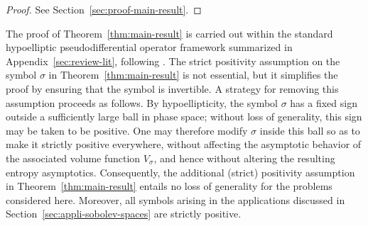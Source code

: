 \documentclass[a4paper,12pt]{article}
\newtheorem{theorem}{Theorem}%
\newcommand{\R}{\mathbb{R}}
\newcommand{\diff}{\mathop{}\!d}
\newcommand{\hyposymbclassinv}{\mathrm{H}\Gamma^{-m_+,-m_-}_\rho}
\newlength{\mylabelwidth}
\newenvironment{citemize}
  {\begin{list}{}%
     {\setlength{\labelwidth}{\mylabelwidth}%
      \setlength{\leftmargin}{\dimexpr\labelwidth+\labelsep\relax}%
      \renewcommand{\makelabel}[1]{\makebox[\labelwidth][c]{##1}}}}
  {\end{list}}
\begin{document}
    
    

    

\begin{proof}
See Section~\ref{sec:proof-main-result}.
\end{proof}





\noindent
The proof of Theorem~\ref{thm:main-result} is carried out within the standard
hypoelliptic pseudodifferential operator framework summarized in
Appendix~\ref{sec:review-lit}, following \cite{shubin_pseudodifferential_2001}.
The strict positivity assumption on the symbol $\sigma$ in
Theorem~\ref{thm:main-result} is not essential, but it simplifies the proof by
ensuring that the symbol is invertible. A strategy for removing this assumption
proceeds as follows. By hypoellipticity, the symbol $\sigma$ has a fixed sign
outside a sufficiently large ball in phase space; without loss of generality,
this sign may be taken to be positive. One may therefore modify $\sigma$ inside
this ball so as to make it strictly positive everywhere, without affecting the
asymptotic behavior of the associated volume function $V_\sigma$, and hence
without altering the resulting entropy asymptotics. Consequently, the additional (strict) positivity assumption in
Theorem~\ref{thm:main-result} entails no loss of generality for the problems
considered here. Moreover, all symbols arising in the applications discussed in
Section~\ref{sec:appli-sobolev-spaces} are strictly positive. 
\end{document}
